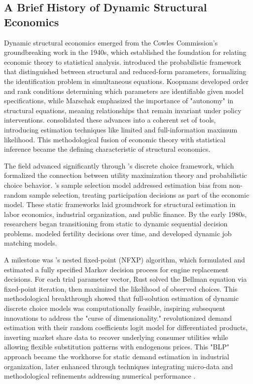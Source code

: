 \subsection{A Brief History of Dynamic Structural Economics}

Dynamic structural economics emerged from the Cowles Commission's groundbreaking work in the 1940s, which established the foundation for relating economic theory to statistical analysis. \citet{Haavelmo1944} introduced the probabilistic framework that distinguished between structural and reduced-form parameters, formalizing the identification problem in simultaneous equations. Koopmans developed order and rank conditions determining which parameters are identifiable given model specifications, while Marschak emphasized the importance of "autonomy" in structural equations, meaning relationships that remain invariant under policy interventions. \citet{HoodKoopmans1953} consolidated these advances into a coherent set of tools, introducing estimation techniques like limited and full-information maximum likelihood. This methodological fusion of economic theory with statistical inference became the defining characteristic of structural economics.

The field advanced significantly through \citet{McFadden1974}'s discrete choice framework, which formalized the connection between utility maximization theory and probabilistic choice behavior. \citet{Heckman1979}'s sample selection model addressed estimation bias from non-random sample selection, treating participation decisions as part of the economic model. These static frameworks laid groundwork for structural estimation in labor economics, industrial organization, and public finance. By the early 1980s, researchers began transitioning from static to dynamic sequential decision problems. \citet{Wolpin1984} modeled fertility decisions over time, and \citet{Miller1984} developed dynamic job matching models.

A milestone was \citet{Rust1987}'s nested fixed-point (NFXP) algorithm, which formulated and estimated a fully specified Markov decision process for engine replacement decisions. For each trial parameter vector, Rust solved the Bellman equation via fixed-point iteration, then maximized the likelihood of observed choices. This methodological breakthrough showed that full-solution estimation of dynamic discrete choice models was computationally feasible, inspiring subsequent innovations to address the "curse of dimensionality." \citet{BerryLevinsohnPakes1995} revolutionized demand estimation with their random coefficients logit model for differentiated products, inverting market share data to recover underlying consumer utilities while allowing flexible substitution patterns with endogenous prices. This "BLP" approach became the workhorse for static demand estimation in industrial organization, later enhanced through techniques integrating micro-data \citep{Petrin2002} and methodological refinements addressing numerical performance \citep{DubeFoxSu2012}.


